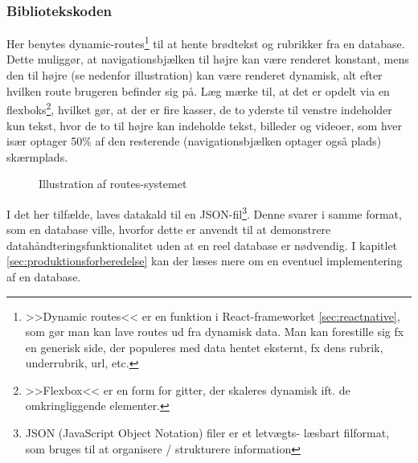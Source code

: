 \subsubsection{Bibliotekskoden}
Her benytes dynamic-routes\footnote{>>Dynamic routes<< er en funktion i React-frameworket \ref{sec:reactnative}, som gør man kan lave routes ud fra dynamisk data. Man kan forestille sig fx en generisk side, der populeres med data hentet eksternt, fx dens rubrik, underrubrik, url, etc.} til at hente brødtekst og rubrikker fra en database. Dette muliggør, at navigationsbjælken til højre kan være renderet konstant, mens den til højre (se nedenfor illustration) kan være renderet dynamisk, alt efter hvilken route brugeren befinder sig på. Læg mærke til, at det er opdelt via en flexboks\footnote{>>Flexbox<< er en form for gitter, der skaleres dynamisk ift. de omkringliggende elementer.}, hvilket gør, at der er fire kasser, de to yderste til venstre indeholder kun tekst, hvor de to til højre kan indeholde tekst, billeder og videoer, som hver især optager 50\% af den resterende (navigationsbjælken optager også plads) skærmplads.

\begin{figure}[H]
    \centering
    \caption{Illustration af routes-systemet}
    \label{fig:routes}
\end{figure}

I det her tilfælde, laves datakald til en JSON-fil\footnote{JSON (JavaScript Object Notation) filer er et letvægts- læsbart filformat, som bruges til at organisere / strukturere information}. Denne svarer i samme format, som en database ville, hvorfor dette er anvendt til at demonstrere datahåndteringsfunktionalitet uden at en reel database er nødvendig. I kapitlet \ref{sec:produktionsforberedelse} kan der læses mere om en eventuel implementering af en database.

